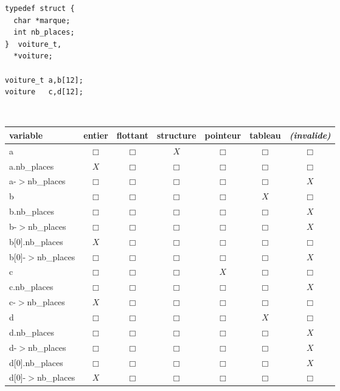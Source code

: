 \documentclass[10pt, sansserif,
               firstcolor=color1,
               secondcolor=color2,
               logo=logo-TN, 
               footband=bandeau-TN]{TelecomNancy}
\newcommand{\BoxRep}{X}%
\begin{document}
\medskip
\noindent\hspace{-.8em}\begin{minipage}{.23\linewidth}

\begin{Verbatim}
typedef struct {
  char *marque;
  int nb_places;
}  voiture_t, 
  *voiture; 

voiture_t a,b[12];
voiture   c,d[12];
\end{Verbatim}  
\end{minipage}~\begin{minipage}{.7\linewidth}
\begin{tabular}{|l|c|c|c|c|c|c|}\hline
  variable & entier & flottant & structure & pointeur & tableau & \textit{(invalide)}
  \\\hline
  a & $\Box$ & $\Box$ & $\BoxRep$ & $\Box$ & $\Box$ & $\Box$\\\hline
  a.nb\_places    & $\BoxRep$ & $\Box$ & $\Box$ & $\Box$ & $\Box$ & $\Box$\\\hline
  a-$>$nb\_places & $\Box$ & $\Box$ & $\Box$ & $\Box$ & $\Box$ & $\BoxRep$\\\hline
  b & $\Box$ & $\Box$ & $\Box$ & $\Box$ & $\BoxRep$ & $\Box$\\\hline
  b.nb\_places    & $\Box$ & $\Box$ & $\Box$ & $\Box$ & $\Box$ & $\BoxRep$\\\hline
  b-$>$nb\_places & $\Box$ & $\Box$ & $\Box$ & $\Box$ & $\Box$ & $\BoxRep$\\\hline
  b[0].nb\_places    & $\BoxRep$ & $\Box$ & $\Box$ & $\Box$ & $\Box$ & $\Box$\\\hline
  b[0]-$>$nb\_places & $\Box$ & $\Box$ & $\Box$ & $\Box$ & $\Box$ & $\BoxRep$\\\hline
  c & $\Box$ & $\Box$ & $\Box$ & $\BoxRep$ & $\Box$ & $\Box$\\\hline
  c.nb\_places    & $\Box$ & $\Box$ & $\Box$ & $\Box$ & $\Box$ & $\BoxRep$\\\hline
  c-$>$nb\_places & $\BoxRep$ & $\Box$ & $\Box$ & $\Box$ & $\Box$ & $\Box$\\\hline
  d & $\Box$ & $\Box$ & $\Box$ & $\Box$ & $\BoxRep$ & $\Box$\\\hline
  d.nb\_places    & $\Box$ & $\Box$ & $\Box$ & $\Box$ & $\Box$ & $\BoxRep$\\\hline
  d-$>$nb\_places & $\Box$ & $\Box$ & $\Box$ & $\Box$ & $\Box$ & $\BoxRep$\\\hline
  d[0].nb\_places    & $\Box$ & $\Box$ & $\Box$ & $\Box$ & $\Box$ & $\BoxRep$\\\hline
  d[0]-$>$nb\_places & $\BoxRep$ & $\Box$ & $\Box$ & $\Box$ & $\Box$ & $\Box$\\\hline
\end{tabular}
\end{minipage}
\end{document}
